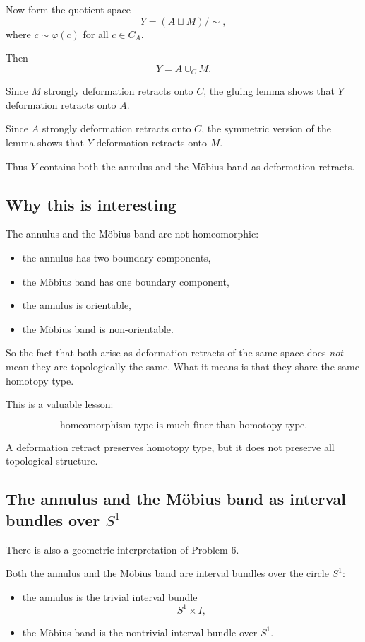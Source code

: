 \documentclass[12pt,a4paper]{article}
\theoremstyle{notespace}
\begin{document}
Now form the quotient space
\[
Y=(A\sqcup M)/\sim,
\]
where \(c\sim \varphi(c)\) for all \(c\in C_A\).

Then
\[
Y=A\cup_C M.
\]

Since \(M\) strongly deformation retracts onto \(C\), the gluing lemma shows that \(Y\) deformation retracts onto \(A\).

Since \(A\) strongly deformation retracts onto \(C\), the symmetric version of the lemma shows that \(Y\) deformation retracts onto \(M\).

Thus \(Y\) contains both the annulus and the Möbius band as deformation retracts.

\subsection{Why this is interesting}

The annulus and the Möbius band are not homeomorphic:

\begin{itemize}
	\item the annulus has two boundary components,
	\item the Möbius band has one boundary component,
	\item the annulus is orientable,
	\item the Möbius band is non-orientable.
\end{itemize}

So the fact that both arise as deformation retracts of the same space does \emph{not} mean they are topologically the same. What it means is that they share the same homotopy type.

This is a valuable lesson:

\[
\text{homeomorphism type is much finer than homotopy type.}
\]

A deformation retract preserves homotopy type, but it does not preserve all topological structure.

\subsection{The annulus and the Möbius band as interval bundles over \(S^1\)}

There is also a geometric interpretation of Problem 6.

Both the annulus and the Möbius band are interval bundles over the circle \(S^1\):

\begin{itemize}
	\item the annulus is the trivial interval bundle
	\[
	S^1\times I,
	\]
	\item the Möbius band is the nontrivial interval bundle over \(S^1\).
\end{itemize}
\end{document}
